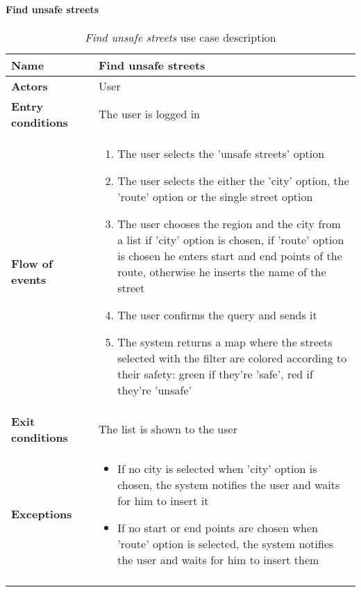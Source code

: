 		\paragraph{Find unsafe streets}
		\begin{longtable}{p{0.25\linewidth}p{0.75\linewidth}}
			\toprule
			\textbf{Name} & \textbf{Find unsafe streets} \\
			\midrule
			\textbf{Actors} & User \\
			\midrule
			\textbf{Entry conditions} & The user is logged in \\
			\midrule
			\textbf{Flow of events} & 
			\begin{enumerate}
				\item The user selects the 'unsafe streets' option
				\item The user selects the either the 'city' option, the 'route' option or the single street option
				\item The user chooses the region and the city from a list if 'city' option is chosen, if 'route' option is chosen he enters start and end points of the route, otherwise he inserts the name of the street
				\item The user confirms the query and sends it
				\item The system returns a map where the streets selected with the filter are colored according to their safety: green if they're 'safe', red if they're 'unsafe'
			\end{enumerate} \\
			\midrule
			\textbf{Exit conditions} & The list is shown to the user\\
			\midrule
			\textbf{Exceptions} & 
			\begin{itemize}
				\item If no city is selected when 'city' option is chosen, the system notifies the user and waits for him to insert it
				\item If no start or end points are chosen when 'route' option is selected, the system notifies the user and waits for him to insert them
			\end{itemize} \\
			\bottomrule
			\caption{\emph{Find unsafe streets} use case description}
		\end{longtable}
		
